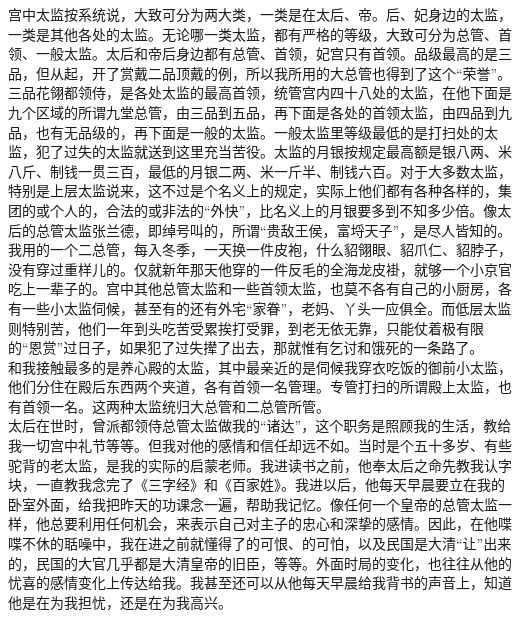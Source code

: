 宫中太监按系统说，大致可分为两大类，一类是在太后、帝。后、妃身边的太监，一类是其他各处的太监。无论哪一类太监，都有严格的等级，大致可分为总管、首领、一般太监。太后和帝后身边都有总管、首领，妃宫只有首领。品级最高的是三品，但从起，开了赏戴二品顶戴的例，所以我所用的大总管也得到了这个“荣誉”。三品花翎都领侍，是各处太监的最高首领，统管宫内四十八处的太监，在他下面是九个区域的所谓九堂总管，由三品到五品，再下面是各处的首领太监，由四品到九品，也有无品级的，再下面是一般的太监。一般太监里等级最低的是打扫处的太监，犯了过失的太监就送到这里充当苦役。太监的月银按规定最高额是银八两、米八斤、制钱一贯三百，最低的月银二两、米一斤半、制钱六百。对于大多数太监，特别是上层太监说来，这不过是个名义上的规定，实际上他们都有各种各样的，集团的或个人的，合法的或非法的“外快”，比名义上的月银要多到不知多少倍。像太后的总管太监张兰德，即绰号叫的，所谓“贵敌王侯，富埒天子”，是尽人皆知的。我用的一个二总管，每入冬季，一天换一件皮袍，什么貂翎眼、貂爪仁、貂脖子，没有穿过重样儿的。仅就新年那天他穿的一件反毛的全海龙皮褂，就够一个小京官吃上一辈子的。宫中其他总管太监和一些首领太监，也莫不各有自己的小厨房，各有一些小太监伺候，甚至有的还有外宅“家眷”，老妈、丫头一应俱全。而低层太监则特别苦，他们一年到头吃苦受累挨打受罪，到老无依无靠，只能仗着极有限的“恩赏”过日子，如果犯了过失撵了出去，那就惟有乞讨和饿死的一条路了。\\

和我接触最多的是养心殿的太监，其中最亲近的是伺候我穿衣吃饭的御前小太监，他们分住在殿后东西两个夹道，各有首领一名管理。专管打扫的所谓殿上太监，也有首领一名。这两种太监统归大总管和二总管所管。\\

太后在世时，曾派都领侍总管太监做我的“诸达”，这个职务是照顾我的生活，教给我一切宫中礼节等等。但我对他的感情和信任却远不如。当时是个五十多岁、有些驼背的老太监，是我的实际的启蒙老师。我进读书之前，他奉太后之命先教我认字块，一直教我念完了《三字经》和《百家姓》。我进以后，他每天早晨要立在我的卧室外面，给我把昨天的功课念一遍，帮助我记忆。像任何一个皇帝的总管太监一样，他总要利用任何机会，来表示自己对主子的忠心和深挚的感情。因此，在他喋喋不休的聒噪中，我在进之前就懂得了的可恨、的可怕，以及民国是大清“让”出来的，民国的大官几乎都是大清皇帝的旧臣，等等。外面时局的变化，也往往从他的忧喜的感情变化上传达给我。我甚至还可以从他每天早晨给我背书的声音上，知道他是在为我担忧，还是在为我高兴。\\


